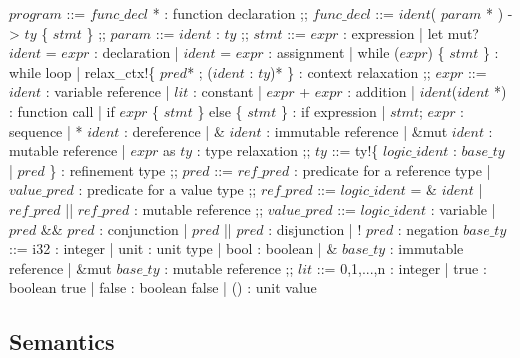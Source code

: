 \documentclass{article}
\newcommand{\ccolon}[0]{: }
\newcommand{\cmid}[0]{| }
\newcommand{\cdisj}[0]{|| }
\theoremstyle{definition}
\begin{document}
\begin{bnfgrammar}
  $program$ ::=
    $func\_decl$ * : function declaration
  ;;
  $func\_decl$ ::=
    $ident$( $param$ * ) -> $ty$ \{ $stmt$ \}
  ;;
  $param$ ::= $ident$ \ccolon  $ty$
  ;;
  $stmt$ ::= 
    $expr$                                                : expression
    | let mut? $ident$ = $expr$                           : declaration
    | $ident$ = $expr$                                    : assignment
    | while ($expr$) \{ $stmt$ \}                         : while loop
    | relax\_ctx!\{ $pred$* ; ($ident$ \ccolon $ty$)* \}  : context relaxation
  ;;
  $expr$ ::=
    $ident$                                         : variable reference
    | $lit$                                         : constant
    | $expr$ + $expr$                               : addition
    | $ident$($ident$ *)                            : function call
    | if $expr$ \{ $stmt$ \} else \{ $stmt$ \}      : if expression
    | $stmt$; $expr$                                : sequence
    | * $ident$                                     : dereference
    | \& $ident$                                    : immutable reference
    | \&mut $ident$                                 : mutable reference
    | $expr$ as $ty$                                : type relaxation
  ;;
  $ty$ ::= ty!\{ $logic\_ident$ \ccolon $base\_ty$ \cmid $pred$ \} : refinement type
  ;;
  $pred$ ::=
    $ref\_pred$                                     : predicate for a reference type 
    | $value\_pred$                                 : predicate for a value type
  ;;
  $ref\_pred$ ::=
    $logic\_ident$ = \& $ident$
    | $ref\_pred$ \cdisj $ref\_pred$         : mutable reference 
  ;;
  $value\_pred$ ::=
    $logic\_ident$                : variable
  | $pred$ \&\& $pred$            : conjunction
  | $pred$ \cdisj $pred$          : disjunction
  | ! $pred$                      : negation
  $base\_ty$ ::=
    i32                     : integer
    | unit                  : unit type
    | bool                  : boolean
    | \& $base\_ty$         : immutable reference
    | \&mut $base\_ty$      : mutable reference
  ;;
  $lit$ ::=
      0,1,...,n             : integer
    | true                  : boolean true
    | false                 : boolean false
    | ()                    : unit value
\end{bnfgrammar}

\subsection{Semantics}
\end{document}
